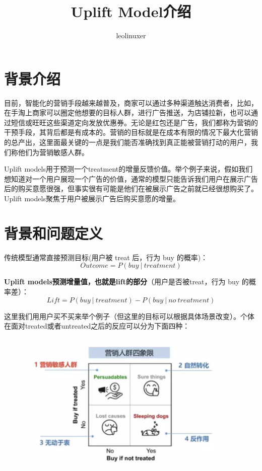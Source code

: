\documentclass[12pt]{article}
\title{Uplift Model介绍\cite{Uplift_Model_In_One_Article}\cite{Uplift_Model_In_Ali}}
\author{leolinuxer}
\begin{document}
\maketitle
\tableofcontents

\section{背景介绍}
目前，智能化的营销手段越来越普及，商家可以通过多种渠道触达消费者，比如，在手淘上商家可以圈定他想要的目标人群，进行广告推送，为店铺拉新，也可以通过短信或旺旺这些渠道定向发放优惠券。无论是红包还是广告，我们都称为营销的干预手段，其背后都是有成本的。营销的目标就是在成本有限的情况下最大化营销的总产出，这里面最关键的一点是我们能否准确找到真正能被营销打动的用户，我们称他们为营销敏感人群。

Uplift models用于预测一个treatment的增量反馈价值。举个例子来说，假如我们想知道对一个用户展现一个广告的价值，通常的模型只能告诉我们用户在展示广告后的购买意愿很强，但事实很有可能是他们在被展示广告之前就已经很想购买了。Uplift models聚焦于用户被展示广告后购买意愿的增量。

\section{背景和问题定义}
传统模型通常直接预测目标(用户被 treat 后，行为 buy 的概率)：
$$
Outcome = P(buy \  | \ treatment)
$$


\textbf{Uplift models预测增量值，也就是lift的部分}（用户是否被treat，行为 buy 的概率差）：
$$
Lift = P(buy \  | \ treatment) - P(buy \ | \ no \ treatment)
$$

这里我们用用户买不买来举个例子（但这里的目标可以根据具体场景改变）。个体在面对treated或者untreated之后的反应可以分为下面四种：
\begin{figure}[H]
    \centering
    \includegraphics[width=1\textwidth]{fig/CasualInference-Uplift-Model-Population.png}
\end{figure}
\end{document}
